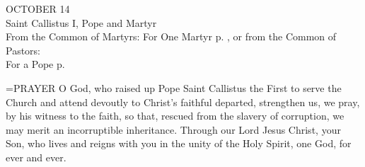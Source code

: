 \begin{center}\normalsize OCTOBER 14\\
\footnotesize Saint Callistus I, Pope and Martyr\\
\footnotesize From the Common of Martyrs: For One Martyr p.   , or from the Common of Pastors:\\
\footnotesize For a Pope p.\\
\end{center}

\hangindent=\parindent \small{PRAYER 
O God, who raised up Pope Saint Callistus the First
to serve the Church
and attend devoutly to Christ's faithful departed,
strengthen us, we pray, by his witness to the faith,
so that, rescued from the slavery of corruption,
we may merit an incorruptible inheritance.
Through our Lord Jesus Christ, your Son,
who lives and reigns with you in the unity of the Holy Spirit,
one God, for ever and ever.\\}
 
